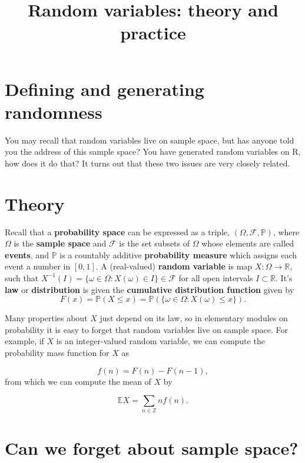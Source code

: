 \documentclass[
]{article}
\title{Random variables: theory and practice}
\author{}
\date{\vspace{-2.5em}}
\theoremstyle{definition}
\theoremstyle{definition}
\theoremstyle{definition}
\theoremstyle{remark}
\begin{document}
\maketitle

{
\setcounter{tocdepth}{2}
\tableofcontents
}
\hypertarget{defining-and-generating-randomness}{%
\section{Defining and generating randomness}\label{defining-and-generating-randomness}}

You may recall that random variables live on sample space, but has anyone told you the address of this sample space? You have generated random variables on R, how does it do that? It turns out that these two issues are very closely related.

\hypertarget{theory}{%
\section{Theory}\label{theory}}

Recall that a \textbf{probability space} can be expressed as a triple, \((\Omega, \mathcal{F}, \mathbb{P})\), where \(\Omega\) is the \textbf{sample space} and \(\mathcal{F}\) is the set subsets of \(\Omega\) whose elements are called \textbf{events}, and \(\mathbb{P}\) is a countably additive \textbf{probability measure} which assigns each event a number in \([0,1]\). A (real-valued) \textbf{random variable} is map \(X : \Omega \to \mathbb{R}\), such that \(X^{-1}(I) = \{\omega \in \Omega: X(\omega) \in I\} \in \mathcal{F}\) for all open intervals \(I \subset \mathbb{R}\). It's \textbf{law} or \textbf{distribution} is given the \textbf{cumulative distribution function} given by
\[F(x) = \mathbb{P}(X \leq x) = \mathbb{P}( \{ \omega \in \Omega:  X(\omega) \leq x\}).\]

Many properties about \(X\) just depend on its law, so in elementary modules on probability it is easy to forget that random variables live on sample space. For example, if \(X\) is an integer-valued random variable, we can compute the probability mass function for \(X\) as

\[f(n) = F(n) - F(n-1),\]
from which we can compute the mean of \(X\) by

\[\mathbb{E} X = \sum_{n \in \mathbb{Z}} n f(n).\]

\hypertarget{can-we-forget-about-sample-space}{%
\section{Can we forget about sample space?}\label{can-we-forget-about-sample-space}}
\end{document}
